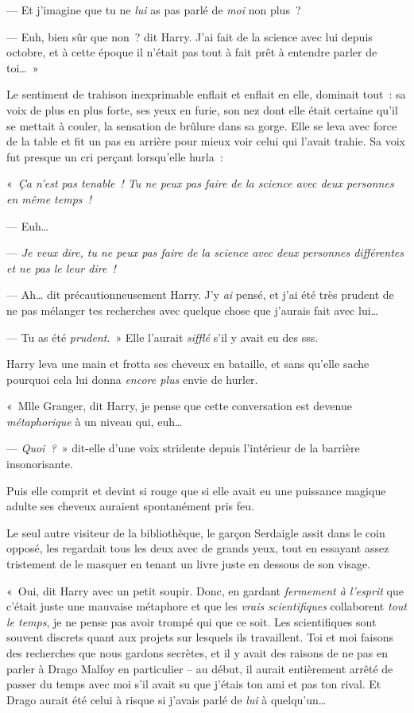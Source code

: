 --- Et j'imagine que tu ne \emph{lui} as pas parlé de \emph{moi} non plus~?

--- Euh, bien sûr que non~? dit Harry.
J'ai fait de la science avec lui depuis octobre, et à cette époque il n'était pas tout à fait prêt à entendre parler de toi…~»

Le sentiment de trahison inexprimable enflait et enflait en elle, dominait tout~: sa voix de plus en plus forte, ses yeux en furie, son nez dont elle était certaine qu'il se mettait à couler, la sensation de brûlure dans sa gorge.
Elle se leva avec force de la table et fit un pas en arrière pour mieux voir celui qui l'avait trahie.
Sa voix fut presque un cri perçant lorsqu'elle hurla~:

«~\emph{Ça n'est pas tenable~!
Tu ne peux pas faire de la science avec deux personnes en même temps~!}

--- Euh…

--- \emph{Je veux dire, tu ne peux pas faire de la science avec deux personnes différentes et ne pas le leur dire~!}

--- Ah… dit précautionneusement Harry.
J'y \emph{ai} pensé, et j'ai été très prudent de ne pas mélanger tes recherches avec quelque chose que j'aurais fait avec lui…

--- Tu as été \emph{prudent}.~»
Elle l'aurait \emph{sifflé} s'il y avait eu des sss.

Harry leva une main et frotta ses cheveux en bataille, et sans qu'elle sache pourquoi cela lui donna \emph{encore plus} envie de hurler.

«~Mlle Granger, dit Harry, je pense que cette conversation est devenue \emph{métaphorique} à un niveau qui, euh…

--- \emph{Quoi~?}~» dit-elle d'une voix stridente depuis l'intérieur de la barrière insonorisante.

Puis elle comprit et devint si rouge que si elle avait eu une puissance magique adulte ses cheveux auraient spontanément pris feu.

Le seul autre visiteur de la bibliothèque, le garçon Serdaigle assit dans le coin opposé, les regardait tous les deux avec de grands yeux, tout en essayant assez tristement de le masquer en tenant un livre juste en dessous de son visage.

«~Oui, dit Harry avec un petit soupir.
Donc, en gardant \emph{fermement à l'esprit} que c'était juste une mauvaise métaphore et que les \emph{vrais scientifiques} collaborent \emph{tout le temps}, je ne pense pas avoir trompé qui que ce soit.
Les scientifiques sont souvent discrets quant aux projets sur lesquels ils travaillent.
Toi et moi faisons des recherches que nous gardons secrètes, et il y avait des raisons de ne pas en parler à Drago Malfoy en particulier -- au début, il aurait entièrement arrêté de passer du temps avec moi s'il avait su que j'étais ton ami et pas ton rival.
Et Drago aurait été celui à risque si j'avais parlé de \emph{lui} à quelqu'un…

